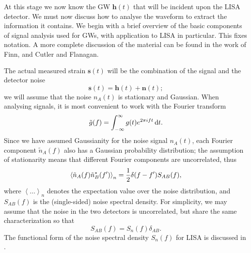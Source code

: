 At this stage we now know the GW $\boldsymbol{h}(t)$ that will be incident upon the LISA detector. We must now discuss how to analyse the waveform to extract the information it contains. We begin with a brief overview of the basic components of signal analysis used for GWs, with application to LISA in particular. This fixes notation. A more complete discussion of the material can be found in the work of Finn\cite{Finn1992}, and Cutler and Flanagan\cite{Cutler1994}.

The actual measured strain $\boldsymbol{s}(t)$ will be the combination of the signal and the detector noise
\begin{equation}
\boldsymbol{s}(t) = \boldsymbol{h}(t) + \boldsymbol{n}(t);
\end{equation}
we will assume that the noise $n_A(t)$ is stationary and Gaussian. When analysing signals, it is most convenient to work with the Fourier transform
\begin{equation}
\tilde{g}(f) = \int_{-\infty}^{\infty}{g(t)e^{2\pi i ft}}\,\mathrm{d}{t}.
\end{equation}
Since we have assumed Gaussianity for the noise signal $n_A(t)$, each Fourier component $\tilde{n}_A(f)$ also has a Gaussian probability distribution; the assumption of stationarity means that different Fourier components are uncorrelated, thus\cite{Cutler1994}
\begin{equation}
\left\langle\tilde{n}_A(f)\tilde{n}_B^*(f')\right\rangle_n = \frac{1}{2}\delta(f - f')S_{AB}(f),
\end{equation}
where $\left\langle\ldots\right\rangle_n$ denotes the expectation value over the noise distribution, and $S_{AB}(f)$ is the (single-sided) noise spectral density. For simplicity, we may assume that the noise in the two detectors is uncorrelated, but share the same characterization so that\cite{Cutler1998}
\begin{equation}
S_{AB}(f) = S_n(f)\delta_{AB}.
\end{equation}
The functional form of the noise spectral density $S_n(f)$ for LISA is discussed in .


